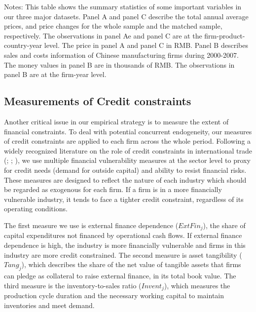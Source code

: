 \documentclass[12pt]{article}
\begin{document}
\begin{table}[htbp]
{\begin{threeparttable}
\begin{tabular}{lcccccc}
		\bottomrule
	\end{tabular}
	\begin{tablenotes}
		\footnotesize
		\item[Notes:] This table shows the summary statistics of some important variables in our three major datasets. Panel A and panel C describe the total annual average prices, and price changes for the whole sample and the matched sample, respectively. The observations in panel Ae and panel C are at the firm-product-country-year level. The price in panel A and panel C in RMB. Panel B describes sales and costs information of Chinese manufacturing firms during 2000-2007. The money values in panel B are in thousands of RMB. The observations in panel B are at the firm-year level.
	\end{tablenotes}
	\end{threeparttable}
        }
\end{table}

\subsection{Measurements of Credit constraints} \label{Measurements-Credit Constraints}

Another critical issue in our empirical strategy is to measure the extent of financial constraints. To deal with potential concurrent endogeneity, our measures of credit constraints are applied to each firm across the whole period. Following a widely recognized literature on the role of credit constraints in international trade (\cite{kroszner2007}; \cite{manova-wei-zhang2015}; \cite{fan-lai-li2015}), we use multiple financial vulnerability measures at the sector level to proxy for credit needs (demand for outside capital) and ability to resist financial risks. These measures are designed to reflect the nature of each industry which should be regarded as exogenous for each firm. If a firm is in a more financially vulnerable industry, it tends to face a tighter credit constraint, regardless of its operating conditions.

The first measure we use is external finance dependence ($ExtFin_j$), the share of capital expenditures not financed by operational cash flows. If external finance dependence is high, the industry is more financially vulnerable and firms in this industry are more credit constrained. The second measure is asset tangibility ($Tang_j$), which describes the share of the net value of tangible assets that firms can pledge as collateral to raise external finance, in its total book value. The third measure is the inventory-to-sales ratio ($Invent_j$), which measures the production cycle duration and the necessary working capital to maintain inventories and meet demand. 
\end{document}
